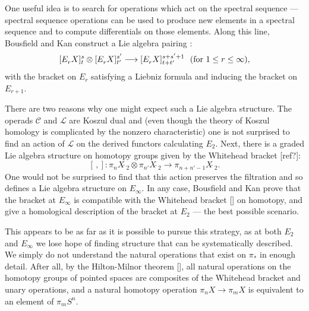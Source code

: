 \documentclass[11pt]{amsart} \renewcommand{\baselinestretch}{1.2}
\theoremstyle{plain}
\theoremstyle{definition}
\renewcommand{\to}{\longrightarrow}
\newcommand{\scrL}{\mathscr{L}}
\newcommand{\scrC}{\mathscr{C}}
\newcommand{\LieOperad}{{\scrL}}
\newcommand{\CommOperad}{{\scrC}}
\newcommand{\E}[5]{[E^{#1}_{#2}#3]^{#4}_{#5}}
\begin{document}
\begin{Introduction}
One useful idea is to search for operations which act on the spectral sequence --- spectral sequence operations can be used to produce new elements in a spectral sequence and to compute differentials on those elements. Along this line, Bousfield and Kan construct a Lie algebra pairing \cite[\S14]{BK_pairings_products.pdf}:
\[\E{}{r}{X}{s}{t} \otimes \E{}{r}{X}{s'}{t'}\to \E{}{r}{X}{s+s'+1}{t+t'}\textup{ \ (for $1\leq r\leq \infty$)},\]
with the bracket on $E_r$ satisfying  a Liebniz formula and inducing the bracket on $E_{r+1}$.

There are two reasons why one might expect such a Lie algebra structure. %
The operads $\CommOperad$ and $\LieOperad$ are Koszul dual and (even though the theory of Koszul homology is complicated by the nonzero characteristic) one is not surprised to find an action of $\LieOperad$ on the derived functors calculating $E_2$. %
Next, there is a graded Lie algebra structure on homotopy groups given by the Whitehead bracket [ref?]:
\[[\,,]:\pi_nX\hat{\ }_{\!\!\!2}\otimes \pi_{n'}X\hat{\ }_{\!\!\!2}\to \pi_{n+n'-1}X\hat{\ }_{\!\!\!2}.\]
One would not be surprised to find that  this action preserves the filtration and so defines a Lie algebra structure on $E_\infty$.
In any case, Bousfield and Kan prove that the bracket at $E_\infty$ is compatible with the Whitehead bracket [] on homotopy, and give a homological description  of the bracket at $E_2$ --- the best possible scenario.

This appears to be as far as it is possible to pursue this strategy, as at both $E_2$ and $E_\infty$ we lose hope of finding structure that can be systematically described. %
We simply do not understand the natural operations that exist on $\pi_*$ in enough detail. After all, by the Hilton-Milnor theorem [], all natural operations on the homotopy groups of pointed spaces are composites of the Whitehead bracket and unary operations, and a natural  homotopy operation $\pi_n X\to \pi_m X$ is equivalent to an element of $\pi_m S^n$.


\end{Introduction}
\end{document}
